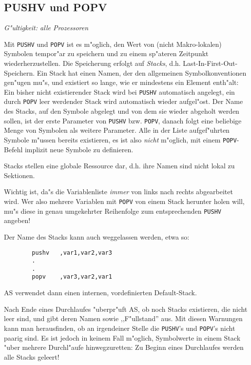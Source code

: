 \documentclass[12pt,a4paper,twoside]{report}
\makeatletter
\newcommand{\tty}[1]{{\tt #1}}
\newcommand{\ttindex}[1]{\index{#1@{\tt #1}}}
\makeatother
\begin{document}

\subsection{PUSHV und POPV}
\ttindex{PUSHV}\ttindex{POPV}

{\em G"ultigkeit: alle Prozessoren}

Mit \tty{PUSHV} und \tty{POPV} ist es m"oglich, den Wert von (nicht
Makro-lokalen) Symbolen tempor"ar zu speichern und zu einem sp"ateren
Zeitpunkt wiederherzustellen.  Die Speicherung erfolgt auf {\em Stacks},
d.h. Last-In-First-Out-Speichern.  Ein Stack hat einen Namen, der den
allgemeinen Symbolkonventionen gen"ugen mu"s, und existiert so lange,
wie er mindestens ein Element enth"alt: Ein bisher nicht existierender
Stack wird bei \tty{PUSHV} automatisch angelegt, ein durch \tty{POPV} leer
werdender Stack wird automatisch wieder aufgel"ost.  Der Name des Stacks,
auf den Symbole abgelegt und von dem sie wieder abgeholt werden sollen,
ist der erste Parameter von \tty{PUSHV} bzw. \tty{POPV}, danach folgt
eine beliebige Menge von Symbolen als weitere Parameter.  Alle in der
Liste aufgef"uhrten Symbole m"ussen bereits existieren, es ist also
{\em nicht} m"oglich, mit einem \tty{POPV}-Befehl implizit neue Symbole
zu definieren.
\par
Stacks stellen eine globale Ressource dar, d.h. ihre Namen sind
nicht lokal zu Sektionen.
\par
Wichtig ist, da"s die Variablenliste {\em immer} von links nach rechts
abgearbeitet wird.  Wer also mehrere Variablen mit \tty{POPV} von einem
Stack herunter holen will, mu"s diese in genau umgekehrter Reihenfolge
zum entsprechenden \tty{PUSHV} angeben!
\par
Der Name des Stacks kann auch weggelassen werden, etwa so:
\begin{verbatim}
        pushv   ,var1,var2,var3
        .
        .
        popv    ,var3,var2,var1
\end{verbatim}
AS verwendet dann einen internen, vordefinierten Default-Stack.
\par
Nach Ende eines Durchlaufes "uberpr"uft AS, ob noch Stacks existieren,
die nicht leer sind, und gibt deren Namen sowie ,,F"ullstand'' aus.  Mit
diesen Warnungen kann man herausfinden, ob an irgendeiner Stelle die
\tty{PUSHV}'s und \tty{POPV}'s nicht paarig sind.  Es ist jedoch in
keinem Fall m"oglich, Symbolwerte in einem Stack "uber mehrere Durchl"aufe
hinwegzuretten: Zu Beginn eines Durchlaufes werden alle Stacks geleert!
\end{document}
